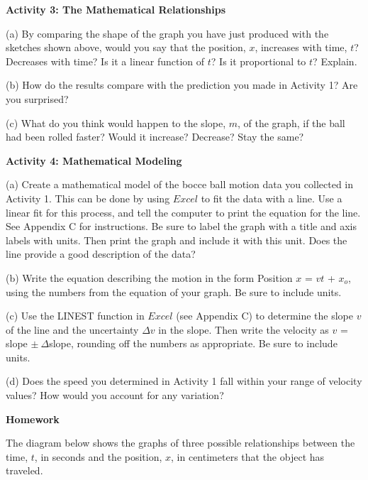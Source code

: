 \textbf{Activity 3: The Mathematical Relationships} 

(a) By comparing the shape of the graph you have just produced with the sketches
shown above, would you say that the position, $x$, increases with time, 
$t$? Decreases
with time? Is it a linear function of $t$? Is it proportional to $t$? Explain.
\vspace{20mm}

(b) How do the results compare with the prediction you made in Activity 1? Are
you surprised?
\vspace{20mm}

(c) What do you think would happen to the slope, $m$, of the graph, if the ball
had been rolled faster? Would it increase? Decrease? Stay the same?
\vspace{20mm}

\textbf{Activity 4: Mathematical Modeling} 

(a) Create a mathematical model of the bocce ball motion data you collected
in Activity 1. This can be done by using $Excel$ to fit the data with
a line. Use a linear fit for this process, and tell the computer to print
the equation for the line. See Appendix C for instructions. 
Be sure to label the graph with a title and axis labels with units. Then print
the graph and include it with this unit.
Does the line provide a good description of the data?
\vspace{20mm}

(b) Write the equation describing the motion in the form Position $x$ = $vt$ + 
$x_{o}$, using the numbers from the equation of your graph.  Be sure to include units.
\newpage

(c) Use the LINEST function in $Excel$ (see Appendix C) to determine the slope 
$v$ of the line and the uncertainty \( \Delta  v\) in the slope.  Then write 
the velocity as $v$ = slope \( \pm \ \Delta  \)slope, rounding off the numbers as appropriate.  Be sure to include units.
\vspace{30mm}

(d) Does the speed you determined in Activity 1 fall within your range of velocity values?  How would you account for any variation?
\vspace{30mm}

\textbf{Homework} 

The diagram below shows the graphs of three possible relationships between the
time, $t$, in seconds and the position, $x$, in centimeters that the object has
traveled.

